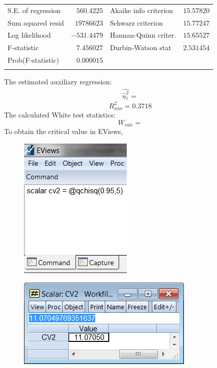 \documentclass[12pt]{report}
\begin{document}
\begin{table}[H]
\begin{tabular}{lrrrr}
		\multicolumn{1}{l}{S.E. of regression}&\multicolumn{1}{r}{$560.4225$}&\multicolumn{2}{l}{Akaike info criterion}&\multicolumn{1}{r}{$15.57820$}\\
		\multicolumn{1}{l}{Sum squared resid}&\multicolumn{1}{r}{$19786623$}&\multicolumn{2}{l}{Schwarz criterion}&\multicolumn{1}{r}{$15.77247$}\\
		\multicolumn{1}{l}{Log likelihood}&\multicolumn{1}{r}{$-531.4479$}&\multicolumn{2}{l}{Hannan-Quinn criter.}&\multicolumn{1}{r}{$15.65527$}\\
		\multicolumn{1}{l}{F-statistic}&\multicolumn{1}{r}{$7.456027$}&\multicolumn{2}{l}{Durbin-Watson stat}&\multicolumn{1}{r}{$2.531454$}\\
		\multicolumn{1}{l}{Prob(F-statistic)}&\multicolumn{1}{r}{$0.000015$}&\multicolumn{1}{c}{}&\multicolumn{1}{c}{}&\multicolumn{1}{c}{}\\
		[4.5pt] \hline \\ [-4.5pt]
	\end{tabular}
\end{table}
\vspace{-\baselineskip} \noindent The estimated auxiliary regression:
\begin{align*}
	\widehat{\hat{u}^2_i} =
\end{align*}
$$R^2_{aux} = 0.3718$$ The calculated White test statistics:
$$W_{calc} = $$ \noindent To obtain the critical value in EViews,
\begin{figure}[H]
	\centering
	\includegraphics{tute9_4}
\end{figure}
\vspace{-\baselineskip}
\begin{figure}[H]
	\centering
	\includegraphics{tute9_5}
\end{figure}
\vspace{-\baselineskip}
\end{document}
